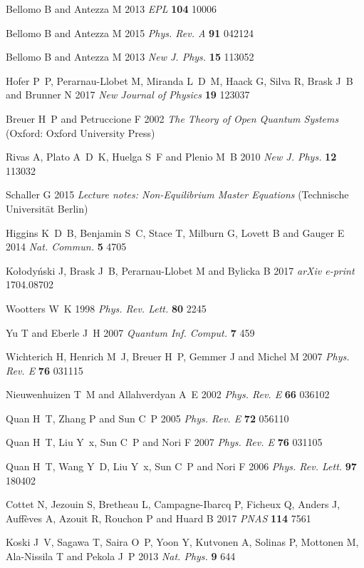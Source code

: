 \documentclass[12pt]{iopart}
\begin{document}
\begin{thebibliography}{10}
Bellomo B and Antezza M 2013 {\em EPL\/} {\bf 104} 10006

Bellomo B and Antezza M 2015 {\em Phys. Rev. A\/} {\bf 91} 042124

Bellomo B and Antezza M 2013 {\em New J. Phys.\/} {\bf 15} 113052

Hofer P~P, Perarnau-Llobet M, Miranda L~D~M, Haack G, Silva R, Brask J~B and
  Brunner N 2017 {\em New Journal of Physics\/} {\bf 19} 123037

Breuer H~P and Petruccione F 2002 {\em The Theory of Open Quantum Systems\/}
  (Oxford: Oxford University Press)

Rivas A, Plato A~D~K, Huelga S~F and Plenio M~B 2010 {\em New J. Phys.\/} {\bf
  12} 113032

Schaller G 2015 {\em Lecture notes: Non-Equilibrium Master Equations\/}
  (Technische Universit\"at Berlin)

Higgins K~D~B, Benjamin S~C, Stace T, Milburn G, Lovett B and Gauger E 2014
  {\em Nat. Commun.\/} {\bf 5} 4705

Ko\l{}ody\'{n}ski J, Brask J~B, Perarnau-Llobet M and Bylicka B 2017 {\em arXiv
  e-print\/}  1704.08702

Wootters W~K 1998 {\em Phys. Rev. Lett.\/} {\bf 80} 2245

Yu T and Eberle J~H 2007 {\em Quantum Inf. Comput.\/} {\bf 7} 459

Wichterich H, Henrich M~J, Breuer H~P, Gemmer J and Michel M 2007 {\em Phys.
  Rev. E\/} {\bf 76} 031115

Nieuwenhuizen T~M and Allahverdyan A~E 2002 {\em Phys. Rev. E\/} {\bf 66}
  036102

Quan H~T, Zhang P and Sun C~P 2005 {\em Phys. Rev. E\/} {\bf 72} 056110

Quan H~T, Liu Y~x, Sun C~P and Nori F 2007 {\em Phys. Rev. E\/} {\bf 76} 031105

Quan H~T, Wang Y~D, Liu Y~x, Sun C~P and Nori F 2006 {\em Phys. Rev. Lett.\/}
  {\bf 97} 180402

Cottet N, Jezouin S, Bretheau L, Campagne-Ibarcq P, Ficheux Q, Anders J,
  Auff\`{e}ves A, Azouit R, Rouchon P and Huard B 2017 {\em PNAS\/} {\bf 114}
  7561

Koski J~V, Sagawa T, Saira O~P, Yoon Y, Kutvonen A, Solinas P, Mottonen M,
  Ala-Nissila T and Pekola J~P 2013 {\em Nat. Phys.\/} {\bf 9} 644


\end{thebibliography}
\end{document}
